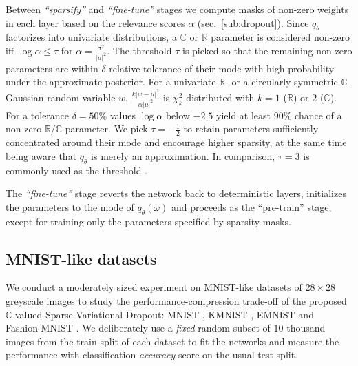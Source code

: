 \documentclass[a4paper,10pt,twocolumn]{article}
\newcommand{\real}{\mathbb{R}}
\newcommand{\cplx}{\mathbb{C}}
\begin{document}
Between \emph{``sparsify''} and \emph{``fine-tune''} stages we compute masks of non-zero
weights in each layer based on the relevance scores $\alpha$ (sec.~\ref{sub:dropout}).
Since $q_\theta$ factorizes into univariate distributions, a $\cplx$ or $\real$ parameter
is considered non-zero iff $\log \alpha \leq \tau$ for $
  \alpha = \tfrac{\sigma^2}{\lvert \mu \rvert^2}
$.
The threshold $\tau$ is picked so that the remaining non-zero parameters are within
$\delta$ relative tolerance of their mode with high probability under the approximate
posterior. For a univariate $\real$- or a circularly symmetric $\cplx$-Gaussian random
variable $w$, $
  \tfrac{k \lvert w - \mu \rvert^2}
        {\alpha \lvert \mu \rvert^2}
$ is $\chi^2_k$ distributed with $k=1$ ($\real$) or $2$ ($\cplx$).
%
For a tolerance $\delta = 50\%$ values $\log \alpha$ below $-2.5$ yield at least $90\%$
chance of a non-zero $\real$/$\cplx$ parameter. We pick $\tau = -\tfrac12$ to retain
parameters sufficiently concentrated around their mode and encourage higher sparsity,
at the same time being aware that $q_\theta$ is merely an approximation. In comparison,
$\tau = 3$ is commonly used as the threshold
\citep{molchanov_variational_2017,kingma_variational_2015}.

The \emph{``fine-tune''} stage reverts the network back to deterministic layers,
initializes the parameters to the mode of $q_\theta(\omega)$ and proceeds as the
``pre-train'' stage, except for training only the parameters specified by sparsity
masks.



\subsection{MNIST-like datasets} %
\label{sub:mnist_like_datasets}

We conduct a moderately sized experiment on MNIST-like datasets of $28\times 28$ greyscale
images to study the performance-compression trade-off of the proposed $\cplx$-valued Sparse
Variational Dropout: MNIST \citep{lecun_gradient-based_1998}, KMNIST \citep{clanuwat_deep_2018},
EMNIST \citep{cohen_emnist_2017} and Fashion-MNIST \citep{xiao_fashion-mnist_2017}.
%
We deliberately use a \emph{fixed} random subset of $10$ thousand images from the train
split of each dataset to fit the networks and measure the performance with classification
\emph{accuracy} score on the usual test split.
\end{document}
